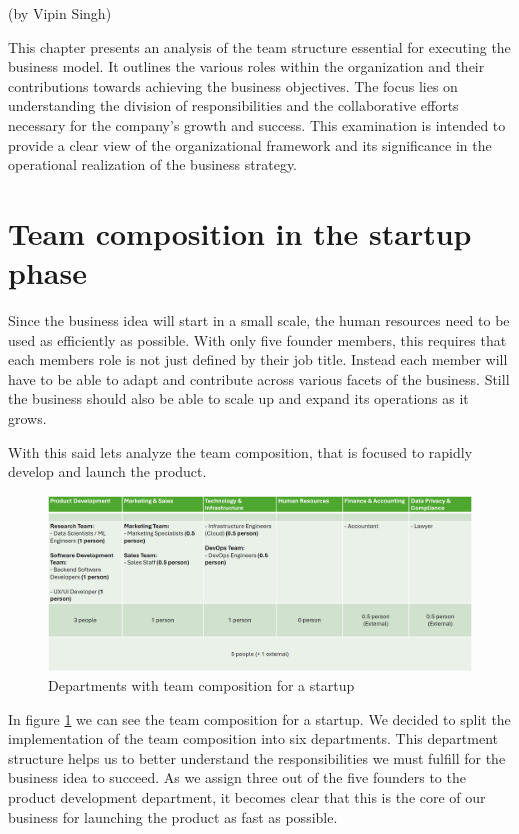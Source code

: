 (by Vipin Singh)

\p
This chapter presents an analysis of the team structure essential for executing the business model.
It outlines the various roles within the organization and their contributions towards achieving the business objectives.
The focus lies on understanding the division of responsibilities and the collaborative efforts necessary for the company's growth and success.
This examination is intended to provide a clear view of the organizational framework and its significance in the operational realization of the business strategy.

\section{Team composition in the startup phase}
Since the business idea will start in a small scale, the human resources need to be used as efficiently as possible.
With only five founder members, this requires that each members role is not just defined by their job title.
Instead each member will have to be able to adapt and contribute across various facets of the business.
Still the business should also be able to scale up and expand its operations as it grows.

\p
With this said lets analyze the team composition, that is focused to rapidly develop and launch the product.

\begin{figure}[H]
    \centering
    \includegraphics[width=\textwidth]{figures/team_comp_startup.png}
    \caption{Departments with team composition for a startup}
    \label{fig:team_comp_startup}
\end{figure}

In figure \ref{fig:team_comp_startup} we can see the team composition for a startup.
We decided to split the implementation of the team composition into six departments.
This department structure helps us to better understand the responsibilities we must fulfill for the business idea to succeed.
As we assign three out of the five founders to the product development department, it becomes clear that this is the core of our business for launching the product as fast as possible.

